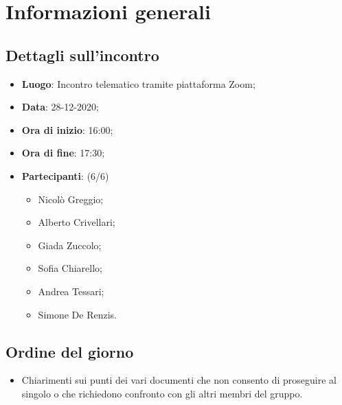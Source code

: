 \section{Informazioni generali}

\subsection{Dettagli sull'incontro}
\begin{itemize}
\item \textbf{Luogo}: Incontro telematico tramite piattaforma Zoom;
\item \textbf{Data}: 28-12-2020;
\item \textbf{Ora di inizio}: 16:00;
\item \textbf{Ora di fine}: 17:30;
\item \textbf{Partecipanti}: (6/6)
\begin{itemize}
	\item Nicolò Greggio;
	\item Alberto Crivellari;
	\item Giada Zuccolo;
	\item Sofia Chiarello;
	\item Andrea Tessari;
	\item Simone De Renzis.
\end{itemize}
\end{itemize}

\subsection{Ordine del giorno}
\begin{itemize}
	\item Chiarimenti sui punti dei vari documenti che non consento di proseguire al singolo o che richiedono confronto con gli altri membri del gruppo.
\end{itemize}


